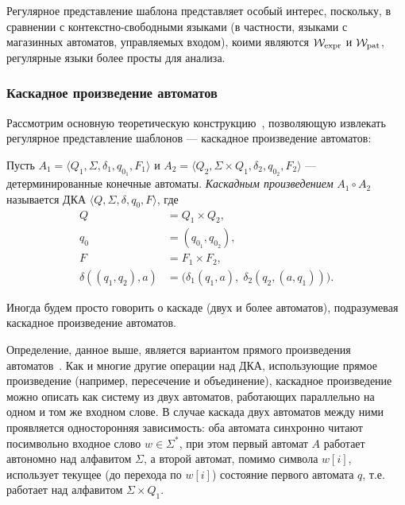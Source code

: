 Регулярное представление шаблона представляет особый интерес, поскольку, в сравнении 
с контекстно-свободными языками (в частности, языками с магазинных автоматов, управляемых входом), 
коими являются $\mathcal{W}_{\text{expr}}$ и $\mathcal{W}_{\text{pat}}$, регулярные языки более просты для анализа. 

\subsubsection{Каскадное произведение автоматов} %

Рассмотрим основную теоретическую конструкцию~\cite{borelli2025cascades},
позволяющую извлекать регулярное представление шаблонов --- каскадное произведение автоматов:

\begin{Definition}
  Пусть $A_1 = \langle Q_1, \Sigma, \delta_1, q_{0_1}, F_1 \rangle$ и
  $A_2 = \langle Q_2, \Sigma \times Q_1, \delta_2, q_{0_2}, F_2 \rangle$ --- детерминированные конечные автоматы.
  \emph{Каскадным произведением} $A_1 \circ A_2$ называется ДКА $\langle Q, \Sigma, \delta, q_0, F \rangle$, где
  \begin{align*}
    Q &= Q_1 \times Q_2, \\
    q_0 &= (q_{0_1}, q_{0_2}), \\
    F &= F_1 \times F_2, \\
    \delta((q_1, q_2), a) &= \bigl( \delta_1(q_1, a),\; \delta_2(q_2, (a, q_1)) \bigr).
  \end{align*}
\end{Definition}

Иногда будем просто говорить о каскаде (двух и более автоматов), подразумевая каскадное произведение автоматов.

Определение, данное выше, является вариантом прямого произведения автоматов~\cite{hopcroft2006automata}. Как и многие другие операции над ДКА, использующие прямое произведение (например, пересечение и объединение), каскадное произведение можно описать как систему из двух автоматов, 
работающих параллельно на одном и том же входном слове. В случае каскада двух автоматов между ними проявляется односторонняя зависимость:
оба автомата синхронно читают посимвольно входное слово $w \in \Sigma^*$, при этом первый автомат 
$A$ работает автономно над алфавитом $\Sigma$, а второй автомат, помимо символа $w[i]$, 
использует текущее (до перехода по $w[i]$) состояние первого автомата $q$, т.е. работает над алфавитом $\Sigma \times Q_1$.

